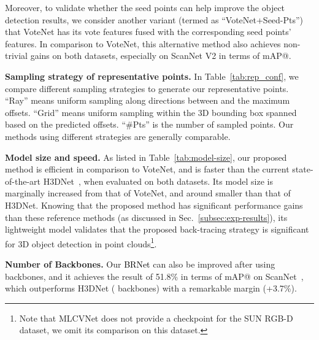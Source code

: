 \documentclass[final]{cvpr}
\newcommand{\method}{\textcolor{black}{BRNet }}
\begin{document}
Moreover, to validate whether the seed points can help improve the object detection results, we consider another variant (termed as ``VoteNet+Seed-Pts'') that VoteNet has its vote features fused with the corresponding seed points' features.
In comparison to VoteNet, this alternative method also achieves non-trivial gains on both datasets, especially on ScanNet V2 in terms of mAP@.


\vspace{+1mm}
\noindent\textbf{Sampling strategy of representative points.}
In Table~\ref{tab:rep_conf}, we compare different sampling strategies to generate our representative points.
``Ray'' means uniform sampling along  directions between  and the maximum offsets. 
``Grid'' means uniform sampling within the 3D bounding box spanned based on the predicted offsets.
``\#Pts'' is the number of sampled points.
Our methods using different strategies are generally comparable. 



\vspace{+1mm}
\noindent\textbf{Model size and speed.}
As listed in Table~\ref{tab:model-size}, our proposed method is efficient in comparison to VoteNet, and is  faster than the current state-of-the-art H3DNet~\cite{h3dnet}, when evaluated on both datasets.
Its model size is marginally increased from that of VoteNet, and around  smaller than that of H3DNet.
Knowing that the proposed method has significant performance gains than these reference methods (as discussed in Sec.~\ref{subsec:exp-results}), its lightweight model validates that the proposed back-tracing strategy is significant for 3D object detection in point clouds\footnote{Note that MLCVNet does not provide a checkpoint for the SUN RGB-D dataset, we omit its comparison on this dataset.}.

\vspace{+1mm}
\noindent\textbf{Number of Backbones.}
Our \method can also be improved after using  backbones, and it achieves the result of 51.8\% in terms of mAP@ on ScanNet~\cite{scannet}, which outperforms H3DNet ( backbones) with a remarkable margin (+3.7\%).
\end{document}
